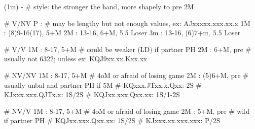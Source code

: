 (1m) -
# style: the stronger the hand, more shapely to pre 2M

# V/NV 
P  : # may be lengthy but not enough values, ex: AJxxxxx.xxx.xx.x
1M : (8)9-16(17), 5+M
2M : 13-16, 6+M, 5.5 Loser
3m : 13-16, (6)7+m, 5.5 Loser

# V/V
1M : 8-17, 5+M  # could be weaker (LD) if partner PH
2M : 6+M, pre  # usually not 6322; unless ex: KQJ9xx.xx.Kxx.xx

# NV/NV
1M : 8-17, 5+M  # 4oM or afraid of losing game
2M : (5)6+M, pre  # usually unbal and partner PH if 5M
# KQxxx.JTxx.x.Qxx: 2S
# KJxxx.xxx.QJTx.x: 1S/2S
# KQJxx.xxx.Qxx.xx: 1S/1-2S

# NV/V 
1M : 8-17, 5+M  # 4oM or afraid of losing game
2M : 5+M, pre  # wild if partner PH 
# KQJxx.xxx.Qxx.xx: 1S/2S
# KJxxx.xx.xxx.xxx: P/2S